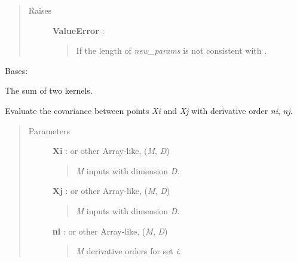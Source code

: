 \documentclass[letterpaper,10pt,english]{sphinxmanual}
\begin{document}
\begin{fulllineitems}
\begin{fulllineitems}
\begin{quote}
\begin{description}
\item[{Raises}] \leavevmode
\textbf{ValueError} :
\begin{quote}

If the length of \emph{new\_params} is not consistent with .
\end{quote}

\end{description}\end{quote}

\end{fulllineitems}


\end{fulllineitems}


\begin{fulllineitems}
\label{gptools.kernel:gptools.kernel.core.SumKernel}
Bases: {\hyperref[gptools.kernel:gptools.kernel.core.BinaryKernel]{}}

The sum of two kernels.

\begin{fulllineitems}
\label{gptools.kernel:gptools.kernel.core.SumKernel.__call__}
Evaluate the covariance between points \emph{Xi} and \emph{Xj} with derivative order \emph{ni}, \emph{nj}.
\begin{quote}\begin{description}
\item[{Parameters}] \leavevmode
\textbf{Xi} :  or other Array-like, (\emph{M}, \emph{D})
\begin{quote}

\emph{M} inputs with dimension \emph{D}.
\end{quote}

\textbf{Xj} :  or other Array-like, (\emph{M}, \emph{D})
\begin{quote}

\emph{M} inputs with dimension \emph{D}.
\end{quote}

\textbf{ni} :  or other Array-like, (\emph{M}, \emph{D})
\begin{quote}

\emph{M} derivative orders for set \emph{i}.
\end{quote}


\end{description}
\end{quote}
\end{fulllineitems}
\end{fulllineitems}
\end{document}
